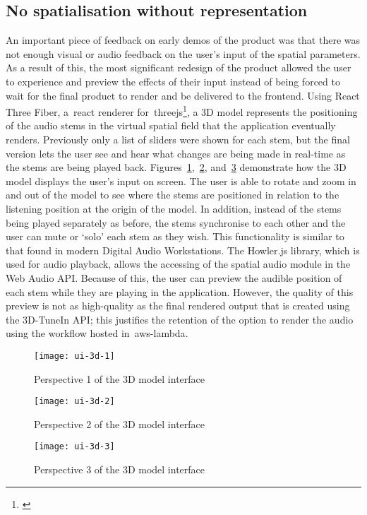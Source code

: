 \subsection{No spatialisation without representation}\label{subsec:no-spatialisation-without-representation}
An important piece of feedback on early demos of the product was that there was not enough visual or audio feedback on the user's input of the spatial parameters.
As a result of this, the most significant redesign of the product allowed the user to experience and preview the effects of their input instead of being forced to wait for the final product to render and be delivered to the frontend.
Using React Three Fiber, a~\gls{react} renderer for~\gls{threejs}\footnote{\citep{dirksen2023learn}}, a 3D model represents the positioning of the audio stems in the virtual spatial field that the application eventually renders.
Previously only a list of sliders were shown for each stem, but the final version lets the user see and hear what changes are being made in real-time as the stems are being played back.
Figures~\ref{fig:ui-3d-1},~\ref{fig:ui-3d-2}, and~\ref{fig:ui-3d-3} demonstrate how the 3D model displays the user's input on screen.
The user is able to rotate and zoom in and out of the model to see where the stems are positioned in relation to the listening position at the origin of the model.
In addition, instead of the stems being played separately as before, the stems synchronise to each other and the user can mute or `solo' each stem as they wish.
This functionality is similar to that found in modern Digital Audio Workstations.
The Howler.js library, which is used for audio playback, allows the accessing of the spatial audio module in the Web Audio API\@.
Because of this, the user can preview the audible position of each stem while they are playing in the application.
However, the quality of this preview is not as high-quality as the final rendered output that is created using the 3D-TuneIn API;
this justifies the retention of the option to render the audio using the workflow hosted in~\gls{aws-lambda}.

\begin{figure}[!htb]
    \minipage{\textwidth}
    \texttt{[image: ui-3d-1]}
    \caption{Perspective 1 of the 3D model interface}\label{fig:ui-3d-1}
    \endminipage
\end{figure}

\begin{figure}[!htb]
    \minipage{\textwidth}
    \texttt{[image: ui-3d-2]}
    \caption{Perspective 2 of the 3D model interface}\label{fig:ui-3d-2}
    \endminipage
\end{figure}

\begin{figure}[!htb]
    \minipage{\textwidth}
    \texttt{[image: ui-3d-3]}
    \caption{Perspective 3 of the 3D model interface}\label{fig:ui-3d-3}
    \endminipage
\end{figure}